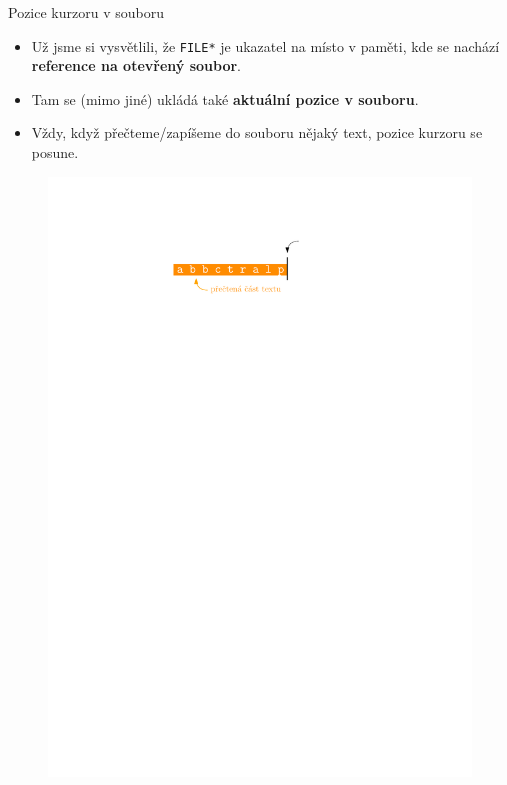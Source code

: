 \documentclass[14pt,aspectratio=169]{beamer}
\begin{document}
    \begin{frame}[t]{Pozice kurzoru v souboru}
        \begin{itemize}
            \item Už jsme si vysvětlili, že \texttt{FILE*} je ukazatel na místo v paměti, kde se nachází \textbf{reference na otevřený soubor}.
            \item Tam se (mimo jiné) ukládá také \textbf{aktuální pozice v souboru}.
            \item Vždy, když přečteme/zapíšeme do souboru nějaký text, pozice kurzoru se posune.
        \end{itemize}
        \begin{figure}
            \centering
            \includegraphics[scale=1]{images/cursor.pdf}
        \end{figure}
    \end{frame}
\end{document}
